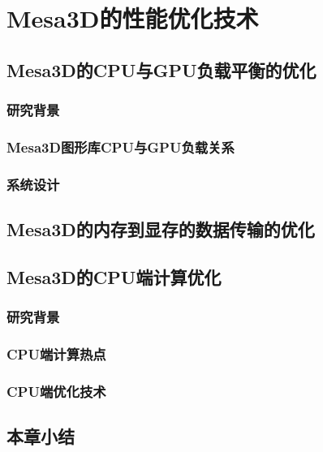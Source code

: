 
\chapter{Mesa3D的性能优化技术}

\section{Mesa3D的CPU与GPU负载平衡的优化}

\subsection{研究背景}

\subsection{Mesa3D图形库CPU与GPU负载关系}

\subsection{系统设计}

\newpage
\section{Mesa3D的内存到显存的数据传输的优化}


\section{Mesa3D的CPU端计算优化}

\subsection{研究背景}

\subsection{CPU端计算热点}

\subsection{CPU端优化技术}

\section{本章小结}
